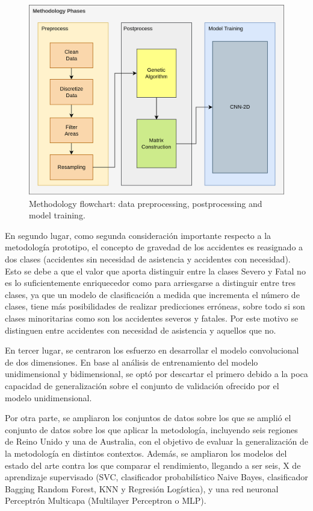 \documentclass{uathesis-es}
\begin{document}
\begin{figure}[H]
    \centering
    \includegraphics[width=14cm]{Figures/7th DataFlow Chart.png}
    \caption{Methodology flowchart: data preprocessing, postprocessing and model training.}
    \label{DataFlow}
\end{figure}

En segundo lugar, como segunda consideración importante respecto a la metodología prototipo, el concepto de gravedad de los accidentes es reasignado a dos clases (accidentes sin necesidad de asistencia y accidentes con necesidad). Esto se debe a que el valor que aporta distinguir entre la clases Severo y Fatal no es lo suficientemente enriquecedor como para arriesgarse a distinguir entre tres clases, ya que un modelo de clasificación a medida que incrementa el número de clases, tiene más posibilidades de realizar predicciones erróneas, sobre todo si son clases minoritarias como son los accidentes severos y fatales. Por este motivo se distinguen entre accidentes con necesidad de asistencia y aquellos que no.

En tercer lugar, se centraron los esfuerzo en desarrollar el modelo convolucional de dos dimensiones. En base al análisis de entrenamiento del modelo unidimensional y bidimensional, se optó por descartar el primero debido a la poca capacidad de generalización sobre el conjunto de validación ofrecido por el modelo unidimensional.

Por otra parte, se ampliaron los conjuntos de datos sobre los que se amplió el conjunto de datos sobre los que aplicar la metodología, incluyendo seis regiones de Reino Unido y una de Australia, con el objetivo de evaluar la generalización de la metodología en distintos contextos. Además, se ampliaron los modelos del estado del arte contra los que comparar el rendimiento, llegando a ser seis, X de aprendizaje supervisado (SVC, clasificador probabilístico Naive Bayes, clasificador Bagging Random Forest, KNN y Regresión Logística), y una red neuronal Perceptrón Multicapa (Multilayer Perceptron o MLP).
\end{document}
